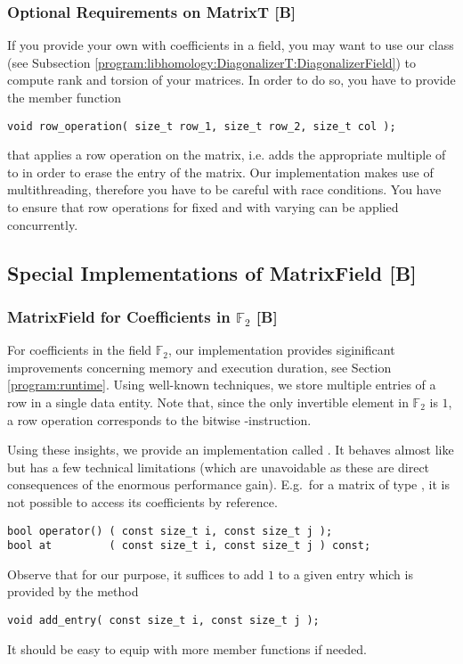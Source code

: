\subsubsection{Optional Requirements on MatrixT [B]}
\label{program:libhomology:MatrixT:optionals}
If you provide your own  with coefficients in a field, you may want to use our class  (see Subsection \ref{program:libhomology:DiagonalizerT:DiagonalizerField}) to compute rank and torsion of your matrices.
In order to do so, you have to provide the member function
\begin{lstlisting}
void row_operation( size_t row_1, size_t row_2, size_t col );
\end{lstlisting}
that applies a row operation on the matrix, 
i.e. adds the appropriate multiple of  to  in order to erase the entry  of the matrix.
Our implementation makes use of multithreading, therefore you have to be careful with race conditions.
You have to ensure that row operations for fixed  and  with varying  can be applied concurrently.

\subsection{Special Implementations of MatrixField [B]}
\label{program:libhomology:MatrixT:MatrixField_for_F_2_and_css}
\subsubsection{MatrixField for Coefficients in \texorpdfstring{$\mathbb F_2$}{Z/2Z} [B]}
For coefficients in the field $\mathbb F_2$, our implementation provides siginificant improvements concerning memory and execution duration, see Section \ref{program:runtime}.
Using well-known techniques, we store multiple entries of a row in a single data entity.
Note that, since the only invertible element in $\mathbb F_2$ is $1$, a row operation corresponds to the bitwise -instruction.

Using these insights, we provide an implementation called .
It behaves almost like  but has a few technical limitations (which are unavoidable as these are direct consequences of the enormous performance gain).
E.g.\ for a matrix of type , it is not possible to access its coefficients by reference.
\begin{lstlisting}
bool operator() ( const size_t i, const size_t j );
bool at         ( const size_t i, const size_t j ) const;
\end{lstlisting}
Observe that for our purpose, it suffices to add $1$ to a given entry which is provided by the method
\begin{lstlisting}
void add_entry( const size_t i, const size_t j );
\end{lstlisting}
It should be easy to equip  with more member functions if needed.

